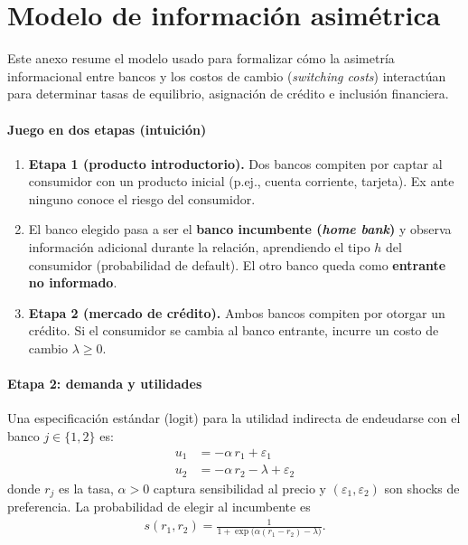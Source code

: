 \documentclass[11pt]{article}
\theoremstyle{plain}
\theoremstyle{plain}
\begin{document}
    \newpage
    \section*{Modelo de información asimétrica}
    \label{sec:modelo}
    {\small

    Este anexo resume el modelo  usado para formalizar cómo la asimetría informacional entre bancos y los costos de cambio (\textit{switching costs}) interactúan para determinar tasas de equilibrio, asignación de crédito e inclusión financiera.

    \paragraph{Juego en dos etapas (intuición)}
    \begin{enumerate}
        \item \textbf{Etapa 1 (producto introductorio).} Dos bancos compiten por captar al consumidor con un producto inicial (p.ej., cuenta corriente, tarjeta). Ex ante ninguno conoce el riesgo del consumidor.
        \item El banco elegido pasa a ser el \textbf{banco incumbente (\textit{home bank})} y observa información adicional durante la relación, aprendiendo el tipo $h$ del consumidor (probabilidad de default). El otro banco queda como \textbf{entrante no informado}.
        \item \textbf{Etapa 2 (mercado de crédito).} Ambos bancos compiten por otorgar un crédito. Si el consumidor se cambia al banco entrante, incurre un costo de cambio $\lambda\ge 0$.
    \end{enumerate}

    \paragraph{Etapa 2: demanda y utilidades}
    Una especificación estándar (logit) para la utilidad indirecta de endeudarse con el banco $j\in\{1,2\}$ es:
    \begin{align*}
        u_{1} &= -\alpha\, r_{1} + \varepsilon_{1}\\
        u_{2} &= -\alpha\, r_{2} - \lambda + \varepsilon_{2}
    \end{align*}
    donde $r_j$ es la tasa, $\alpha>0$ captura sensibilidad al precio y $(\varepsilon_1,\varepsilon_2)$ son shocks de preferencia. La probabilidad de elegir al incumbente es
    \begin{align*}
        s(r_1,r_2) = \frac{1}{1+\exp\!\big(\alpha(r_1-r_2)-\lambda\big)}.
    \end{align*}

}
\end{document}
